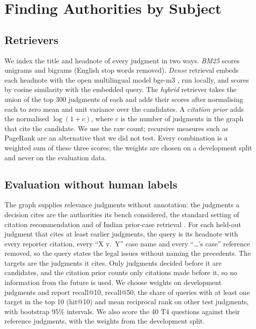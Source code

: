 \section{Finding Authorities by Subject}
\label{sec:retrieval}
\subsection{Retrievers}
We index the title and headnote of every judgment in two ways. \emph{BM25} \cite{robertson2009} scores unigrams and bigrams (English stop words removed). \emph{Dense} retrieval embeds each headnote with the open multilingual model bge-m3 \cite{chen2024m3}, run locally, and scores by cosine similarity with the embedded query. The \emph{hybrid} retriever takes the union of the top 300 judgments of each and adds their scores after normalising each to zero mean and unit variance over the candidates. A \emph{citation prior} adds the normalised $\log(1+c)$, where $c$ is the number of judgments in the graph that cite the candidate. We use the raw count; recursive measures such as PageRank \cite{page1999} are an alternative that we did not test. Every combination is a weighted sum of these three scores; the weights are chosen on a development split and never on the evaluation data.

\subsection{Evaluation without human labels}
The graph supplies relevance judgments without annotation: the judgments a decision cites are the authorities its bench considered, the standard setting of citation recommendation \cite{farber2020} and of Indian prior-case retrieval \cite{joshi2023ucreat}. For each held-out judgment that cites at least \RecMinTargets{} earlier judgments, the query is its headnote with every reporter citation, every ``X v.\ Y'' case name and every ``\ldots's case'' reference removed, so the query states the legal issues without naming the precedents. The targets are the judgments it cites. Only judgments decided before it are candidates, and the citation prior counts only citations made before it, so no information from the future is used. We choose weights on \RecNDev{} development judgments and report recall@10, recall@50, the share of queries with at least one target in the top 10 (hit@10) and mean reciprocal rank on \RecNTest{} other test judgments, with bootstrap 95\% intervals. We also score the 40 T4 questions against their reference judgments, with the weights from the development split.

